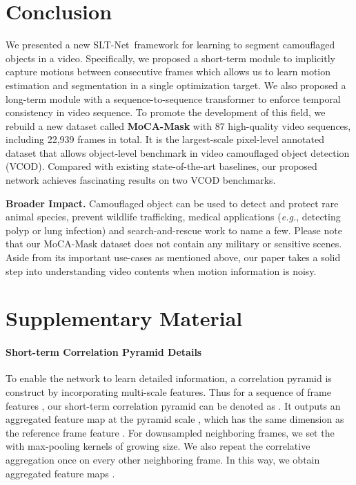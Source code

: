 \documentclass[10pt,twocolumn,letterpaper]{article}
\def\eg{\emph{e.g.}}
\def\Ourmodel{SLT-Net}
\begin{document}
\section{Conclusion}
We presented a new \Ourmodel~framework for learning to segment camouflaged objects in a video. Specifically, we proposed a short-term module to implicitly capture motions between consecutive frames which allows us to learn motion estimation and segmentation in a single optimization target. We also proposed a long-term module with a sequence-to-sequence transformer to enforce temporal consistency in video sequence. 
To promote the development of this field, we rebuild a new dataset called \textbf{MoCA-Mask} with 87 high-quality video sequences, including 22,939 frames in total. It is the largest-scale pixel-level annotated dataset that allows object-level benchmark in video camouflaged object detection (VCOD). Compared with existing state-of-the-art baselines, our proposed network achieves fascinating results on two VCOD benchmarks. 


\textbf{Broader Impact.}  
Camouflaged object can be used to detect and protect rare animal species, prevent wildlife trafficking, medical applications (\eg, detecting polyp or lung infection) and search-and-rescue work to name a few. Please note that our MoCA-Mask dataset does not contain any military or sensitive scenes. Aside from its important use-cases as mentioned above, our paper takes a solid step into understanding video contents when motion information is noisy.

{\small


}

\clearpage




\section{Supplementary Material}

\paragraph{Short-term Correlation Pyramid Details}
To enable the network to learn detailed information, a correlation pyramid  is construct by incorporating multi-scale features. Thus for a sequence of frame features   , our short-term correlation pyramid can be denoted as . It outputs an aggregated feature map  at the pyramid scale , which has the same dimension as the reference frame feature . For downsampled neighboring frames, we set the  with max-pooling kernels of growing size. We also repeat the correlative aggregation once on every other neighboring frame. In this way, we obtain aggregated feature maps . 
\end{document}
